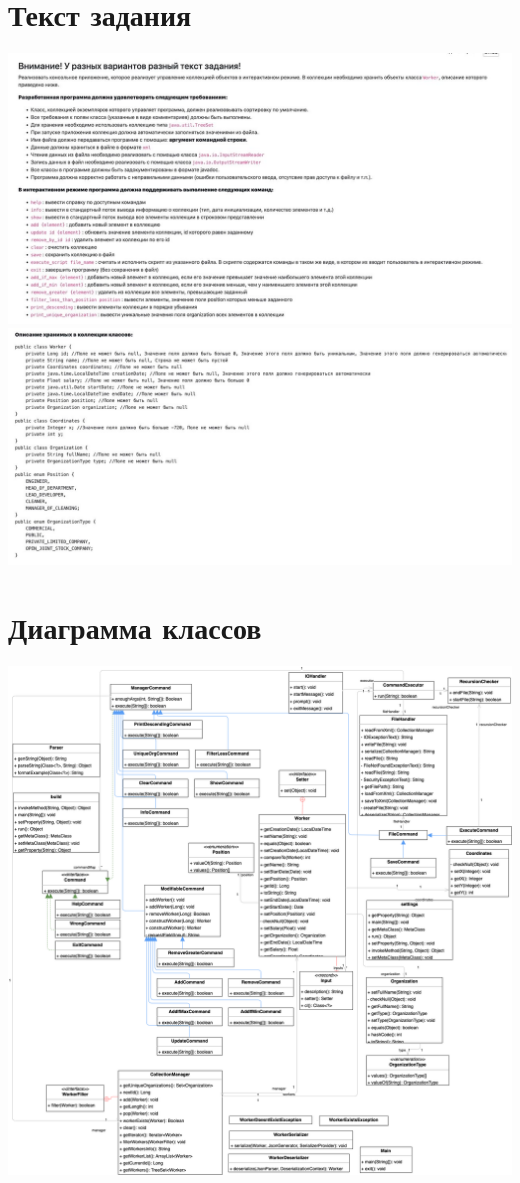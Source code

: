 \documentclass[12pt,onecolumn]{article}
\begin{document}
\section{Текст задания}
\includegraphics[width=\columnwidth]{imgs/lab5_task1.jpg}
\includegraphics[width=\columnwidth]{imgs/lab5_task2.jpg}

\section{Диаграмма классов}
\includegraphics[width=\columnwidth]{imgs/Lab5_graph.png}
\end{document}
